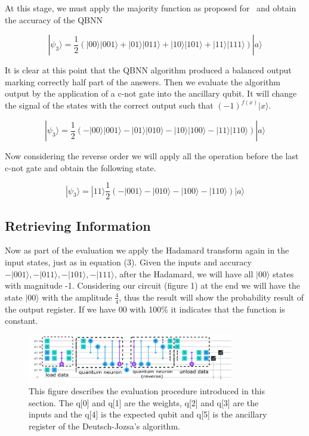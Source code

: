\documentclass[conference]{IEEEtran}
\begin{document}
At this stage, we must apply the majority function as proposed for~\cite{fawaz2019training} and obtain the accuracy of
the QBNN

\begin{equation}
|\psi_3\rangle = \frac{1}{2}(|00\rangle|001\rangle + |01\rangle|011\rangle + |10\rangle|101\rangle + |11\rangle|111\rangle)
|a\rangle
\end{equation}

It is clear at this point that the QBNN algorithm produced a balanced output marking correctly half part of the answers.
Then we evaluate the algorithm output by the application of a c-not gate into the ancillary qubit.
It will change the signal of the states with the correct output such that \((-1)^{f(x)}|x\rangle\).

\begin{equation}
|\psi_3\rangle = \frac{1}{2}(-|00\rangle|001\rangle - |01\rangle|010\rangle - |10\rangle|100\rangle - |11\rangle|110\rangle)
|a\rangle
\end{equation}

Now considering the reverse order we will apply all the operation before the last c-not gate and obtain the following state.

\begin{equation}
|\psi_3\rangle = |11\rangle\frac{1}{2}(-|001\rangle - |010\rangle - |100\rangle - |110\rangle)
|a\rangle
\end{equation}

\subsection{Retrieving Information}\label{subsec:neuron-evaluation}

Now as part of the evaluation we apply the Hadamard transform again in the input states, just as in equation (3).
Given the inputs and accuracy \(-|001\rangle, -|011\rangle, - |101\rangle, -|111\rangle\), after the Hadamard, we will have
all \(|00\rangle\) states with magnitude -1.
Considering our circuit (figure 1) at the end we will have the state \(|00\rangle\) with the amplitude \(\frac{4}{4}\),
thus the result will show the probability result of the output register.
If we have 00 with 100\% it indicates that the function is constant.

\begin{figure}[h!]
    \centering
    \includegraphics[width=9cm, scale=0.5]{images/circuit.pdf}
    \caption{This figure describes the evaluation procedure introduced in this section.
    The q[0] and q[1] are the weights, q[2] and q[3] are the inputs and the q[4] is the expected qubit
    and q[5] is the ancillary register of the Deutsch-Jozsa's algorithm.}\label{Fig:MV}
\end{figure}
\end{document}
